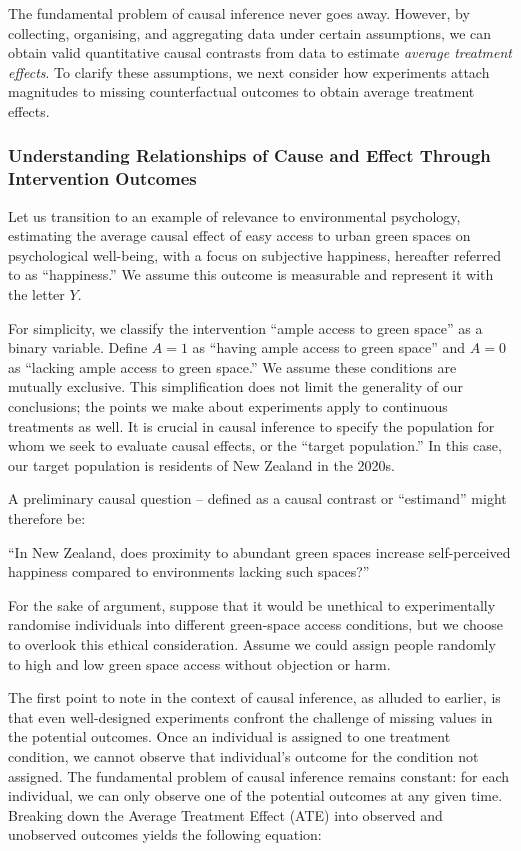 \documentclass[
  singlecolumn]{article}
\begin{document}
The fundamental problem of causal inference never goes away. However, by
collecting, organising, and aggregating data under certain assumptions,
we can obtain valid quantitative causal contrasts from data to estimate
\emph{average treatment effects}. To clarify these assumptions, we next
consider how experiments attach magnitudes to missing counterfactual
outcomes to obtain average treatment effects.

\subsubsection{Understanding Relationships of Cause and Effect Through
Intervention
Outcomes}\label{understanding-relationships-of-cause-and-effect-through-intervention-outcomes}

Let us transition to an example of relevance to environmental
psychology, estimating the average causal effect of easy access to urban
green spaces on psychological well-being, with a focus on subjective
happiness, hereafter referred to as ``happiness.'' We assume this
outcome is measurable and represent it with the letter \(Y\).

For simplicity, we classify the intervention ``ample access to green
space'' as a binary variable. Define \(A = 1\) as ``having ample access
to green space'' and \(A = 0\) as ``lacking ample access to green
space.'' We assume these conditions are mutually exclusive. This
simplification does not limit the generality of our conclusions; the
points we make about experiments apply to continuous treatments as well.
It is crucial in causal inference to specify the population for whom we
seek to evaluate causal effects, or the ``target population.'' In this
case, our target population is residents of New Zealand in the 2020s.

A preliminary causal question -- defined as a causal contrast or
``estimand'' might therefore be:

``In New Zealand, does proximity to abundant green spaces increase
self-perceived happiness compared to environments lacking such spaces?''

For the sake of argument, suppose that it would be unethical to
experimentally randomise individuals into different green-space access
conditions, but we choose to overlook this ethical consideration. Assume
we could assign people randomly to high and low green space access
without objection or harm.

The first point to note in the context of causal inference, as alluded
to earlier, is that even well-designed experiments confront the
challenge of missing values in the potential outcomes. Once an
individual is assigned to one treatment condition, we cannot observe
that individual's outcome for the condition not assigned. The
fundamental problem of causal inference remains constant: for each
individual, we can only observe one of the potential outcomes at any
given time. Breaking down the Average Treatment Effect (ATE) into
observed and unobserved outcomes yields the following equation:
\end{document}
